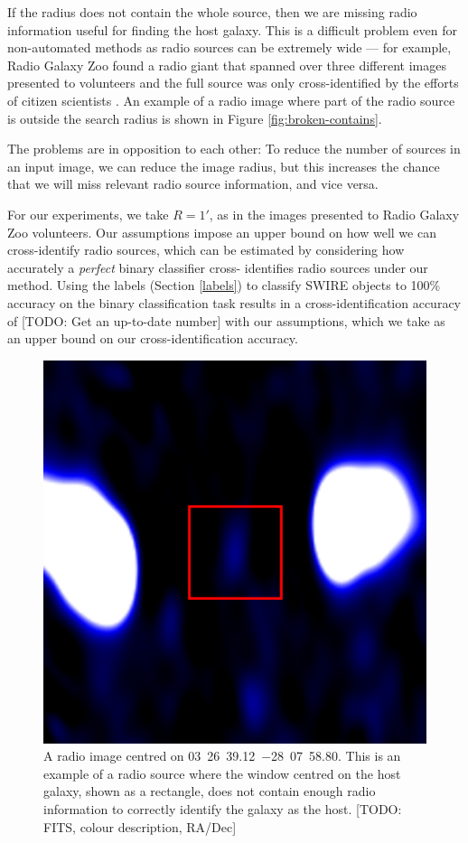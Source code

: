 \documentclass[fleqn,usenatbib,usedcolumn]{mnras}
\begin{document}
    If the radius does not contain the whole source, then we are missing radio
    information useful for finding the host galaxy. This is a difficult
    problem even for non-automated methods as radio sources can be extremely
    wide --- for example, Radio Galaxy Zoo found a radio giant that spanned
    over three different images presented to volunteers and the full source
    was only cross-identified by the efforts of citizen scientists
    \citep{banfield15}. An example of a radio image where part of the radio
    source is outside the search radius is shown in Figure
    \ref{fig:broken-contains}.

    The problems are in opposition to each other: To reduce the number of
    sources in an input image, we can reduce the image radius, but this
    increases the chance that we will miss relevant radio source information,
    and vice versa.

    For our experiments, we take $R = 1'$, as in the images presented to Radio
    Galaxy Zoo volunteers. Our assumptions impose an upper bound on how well
    we can cross-identify radio sources, which can be estimated by considering
    how accurately a \emph{perfect} binary classifier cross- identifies radio
    sources under our method. Using the \citet{norris06} labels (Section
    \ref{labels}) to classify SWIRE objects to 100\% accuracy on the binary
    classification task results in a cross-identification accuracy of [TODO:
    Get an up-to-date number] with our assumptions, which we take as an upper
    bound on our cross-identification accuracy.

    \begin{figure}
      \centering
      \includegraphics[width=0.5\linewidth]{images/ARG0003sky_radio.eps}
      \caption{A radio image centred on 03~26~39.12~$-$28~07~58.80.
        This is an example of a radio source where the window centred on the
        host galaxy, shown as a rectangle, does not contain enough radio
        information to correctly identify the galaxy as the host. [TODO: FITS, colour description, RA/Dec]}
      \label{fig:broken-window-size}
    \end{figure}
\end{document}
